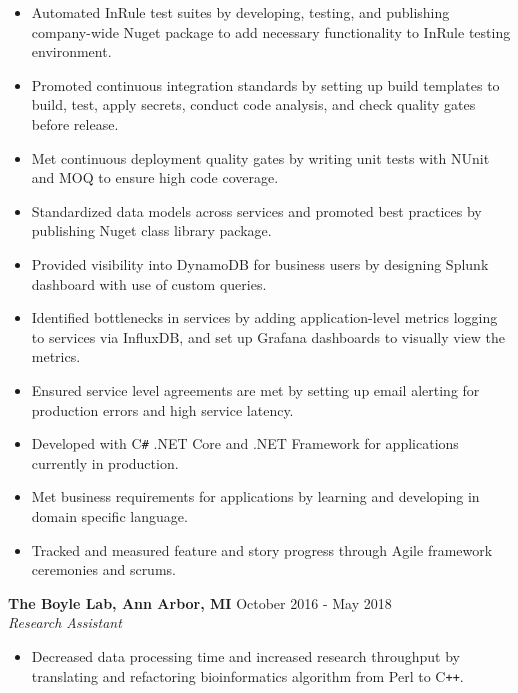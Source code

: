 \documentclass[overlapped]{res}
\begin{document}
\begin{resume}
\begin{itemize}
    \item Automated InRule test suites by developing, testing, and publishing
    company-wide Nuget package to add
    necessary functionality to InRule testing environment.

    \item Promoted continuous integration standards by setting up build templates to build,
    test, apply secrets, conduct code analysis,
    and check quality gates before release.

    \item Met continuous deployment quality gates by writing unit tests
    with NUnit and MOQ to ensure high code coverage.

    \item Standardized data models across services
    and promoted best practices
    by publishing Nuget class library package.

    \item Provided visibility into DynamoDB for business users
    by designing Splunk dashboard with use of
    custom queries.

    \item Identified bottlenecks in services by adding application-level
    metrics logging to services via InfluxDB,
    and set up Grafana dashboards to visually view the metrics.

    \item Ensured service level agreements are met by setting up email alerting 
    for production errors and high service latency.

    \item Developed with C\texttt{\#} .NET Core and .NET Framework
    for applications currently in production.

    \item Met business requirements for applications by learning
    and developing in domain specific language.

    \item Tracked and measured feature and story progress through
    Agile framework ceremonies and scrums.

\end{itemize}

\textbf{The Boyle Lab, Ann Arbor, MI}
\hfill October 2016 - May 2018 \\
{\sl Research Assistant}
    \begin{itemize}  \itemsep -2pt %
    \item Decreased data processing time and increased research throughput
    by translating and refactoring bioinformatics algorithm 
    from Perl to C\texttt{++}.
    

\end{itemize}
\end{resume}
\end{document}
